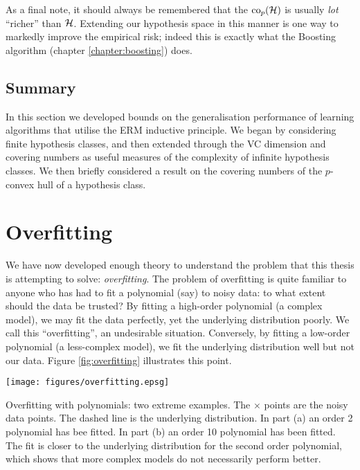 As a final note, it should always be remembered that the
$\mathrm{co}_{p}(\mathcal{H})$ is usually \emph{lot} ``richer'' than $\mathcal{H}$.
Extending our hypothesis space in this manner is one way to markedly
improve the empirical risk; indeed this is exactly what the Boosting
algorithm (chapter \ref{chapter:boosting}) does.


\subsection{Summary}

In this section we developed bounds on the generalisation performance
of learning algorithms that utilise the ERM inductive principle.  We
began by considering finite hypothesis classes, and then extended
through the VC dimension and covering numbers as useful measures of
the complexity of infinite hypothesis classes.  We then briefly
considered a result on the covering numbers of the $p$-convex hull of
a hypothesis class.


\section{Overfitting}
\label{sec:overfitting}

We have now developed enough theory to understand the problem that
this thesis is attempting to solve: \emph{overfitting}.  The problem
of overfitting is quite familiar to anyone who has had to fit a
polynomial (say) to noisy data: to what extent should the data be
trusted?  By fitting a high-order polynomial (a complex model), we may
fit the data perfectly, yet the underlying distribution poorly.  We
call this ``overfitting'', an undesirable situation.  Conversely, by
fitting a low-order polynomial (a less-complex model), we fit the
underlying distribution well but not our data.  Figure
\ref{fig:overfitting} illustrates this point. 

\begin{linefigure}
\begin{center}
\texttt{[image: figures/overfitting.epsg]}
\end{center}
\begin{capt}{Overfitting with polynomials: two extreme examples.}
The $\times$ points are the noisy data points.  The dashed line is the
underlying distribution.  In part (a) an order 2 polynomial has bee
fitted.  In part (b) an order 10 polynomial has been fitted.  The fit
is closer to the underlying distribution for the second order
polynomial, which shows that more complex models do not necessarily
perform better.
\end{capt}
\label{fig:overfitting}
\end{linefigure}

